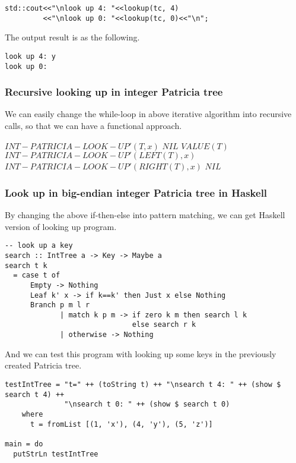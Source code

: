 \documentclass{article}
\begin{document}
\begin{lstlisting}
std::cout<<"\nlook up 4: "<<lookup(tc, 4)
         <<"\nlook up 0: "<<lookup(tc, 0)<<"\n";
\end{lstlisting}

The output result is as the following.

\begin{verbatim}
look up 4: y
look up 0: 
\end{verbatim}

\subsubsection{Recursive looking up in integer Patricia tree}

We can easily change the while-loop in above iterative algorithm into
recursive calls, so that we can have a functional approach.

\begin{algorithmic}
\STATE $INT-PATRICIA-LOOK-UP'(T, x)$
    \RETURN $NIL$ 
    \RETURN $VALUE(T)$
      \RETURN $INT-PATRICIA-LOOK-UP'(LEFT(T), x)$
    \ELSE
      \RETURN $INT-PATRICIA-LOOK-UP'(RIGHT(T), x)$
    \ENDIF
  \ELSE
    \RETURN $NIL$
  \ENDIF
\end{algorithmic}

\subsubsection*{Look up in big-endian integer Patricia tree in Haskell}
By changing the above if-then-else into pattern matching, we can get
Haskell version of looking up program.

\lstset{language=Haskell}
\begin{lstlisting}
-- look up a key
search :: IntTree a -> Key -> Maybe a
search t k 
  = case t of
      Empty -> Nothing
      Leaf k' x -> if k==k' then Just x else Nothing
      Branch p m l r 
             | match k p m -> if zero k m then search l k
                              else search r k
             | otherwise -> Nothing
\end{lstlisting}

And we can test this program with looking up some keys in the
previously created Patricia tree.

\begin{lstlisting}
testIntTree = "t=" ++ (toString t) ++ "\nsearch t 4: " ++ (show $ search t 4) ++
              "\nsearch t 0: " ++ (show $ search t 0)
    where
      t = fromList [(1, 'x'), (4, 'y'), (5, 'z')]

main = do
  putStrLn testIntTree
\end{lstlisting}
\end{document}
